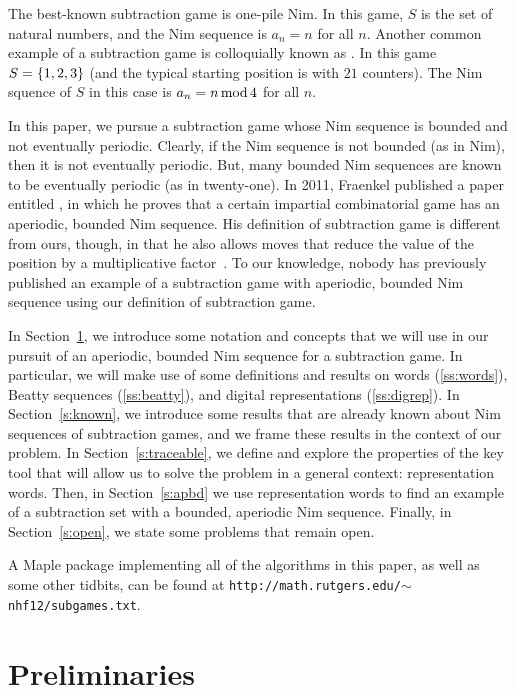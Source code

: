 \documentclass[english,12pt]{article}
\begin{document}
The best-known subtraction game is one-pile Nim.  In this game, $S$ is the set of natural numbers, and the Nim sequence is $a_n=n$ for all $n$.  Another common example of a subtraction game is colloquially known as .  In this game $S=\left\{1,2,3\right\}$ (and the typical starting position is with $21$ counters).  The Nim squence of $S$ in this case is $a_n=n\operatorname{mod} 4$ for all $n$.

In this paper, we pursue a subtraction game whose Nim sequence is bounded and not eventually periodic.  Clearly, if the Nim sequence is not bounded (as in Nim), then it is not eventually periodic.  But, many bounded Nim sequences are known to be eventually periodic (as in twenty-one).  In 2011, Fraenkel published a paper entitled , in which he proves that a certain impartial combinatorial game has an aperiodic, bounded Nim sequence.  His definition of subtraction game is different from ours, though, in that he also allows moves that reduce the value of the position by a multiplicative factor~\cite{fraenkel}.  To our knowledge, nobody has previously published an example of a subtraction game with aperiodic, bounded Nim sequence using our definition of subtraction game.

In Section~\ref{s:prelim}, we introduce some notation and concepts that we will use in our pursuit of an aperiodic, bounded Nim sequence for a subtraction game.  In particular, we will make use of some definitions and results on words (\ref{ss:words}), Beatty sequences (\ref{ss:beatty}), and digital representations (\ref{ss:digrep}).  In Section~\ref{s:known}, we introduce some results that are already known about Nim sequences of subtraction games, and we frame these results in the context of our problem.  In Section~\ref{s:traceable}, we define and explore the properties of the key tool that will allow us to solve the problem in a general context: representation words.  Then, in Section~\ref{s:apbd} we use representation words to find an example of a subtraction set with a bounded, aperiodic Nim sequence.  Finally, in Section~\ref{s:open}, we state some problems that remain open.

A Maple package implementing all of the algorithms in this paper, as well as some other tidbits, can be found at \texttt{http://math.rutgers.edu/$\sim$nhf12/subgames.txt}.

\section{Preliminaries}\label{s:prelim}
\end{document}
